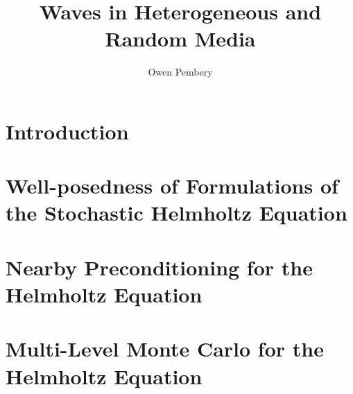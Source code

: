 \documentclass{report}
\title{Waves in Heterogeneous and Random Media}
\author{Owen Pembery}
\begin{document}
\maketitle

\chapter{Introduction}\label{chap:intro}


\chapter{Well-posedness of Formulations of the Stochastic Helmholtz Equation}\label{chap:stochastic}

\chapter{Nearby Preconditioning for the Helmholtz Equation}\label{chap:nbpc}

\chapter{Multi-Level Monte Carlo for the Helmholtz Equation}\label{chap:mlmc}



\end{document}
